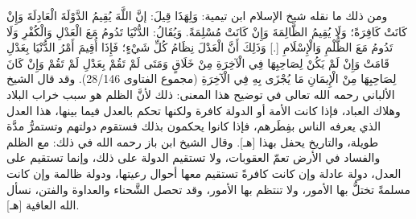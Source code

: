 ومن ذلك ما نقله شيخ الإسلام ابن تيمية: وَلِهَذَا قِيلَ: إنَّ اللَّهَ يُقِيمُ الدَّوْلَةَ الْعَادِلَةَ وَإِنْ كَانَتْ كَافِرَةً؛ وَلَا يُقِيمُ الظَّالِمَةَ وَإِنْ كَانَتْ مُسْلِمَةً. وَيُقَالُ: الدُّنْيَا تَدُومُ مَعَ الْعَدْلِ وَالْكُفْرِ وَلَا تَدُومُ مَعَ الظُّلْمِ وَالْإِسْلَامِ [.] وَذَلِكَ أَنَّ الْعَدْلَ نِظَامُ كُلِّ شَيْءٍ؛ فَإِذَا أُقِيمَ أَمْرُ الدُّنْيَا بِعَدْلِ قَامَتْ وَإِنْ لَمْ يَكُنْ لِصَاحِبِهَا فِي الْآخِرَةِ مِنْ خَلَاقٍ وَمَتَى لَمْ تَقُمْ بِعَدْلِ لَمْ تَقُمْ وَإِنْ كَانَ لِصَاحِبِهَا مِنْ الْإِيمَانِ مَا يُجْزَى بِهِ فِي الْآخِرَةِ {\footnotesize (مجموع الفتاوى 28/146)}. وقد قال الشيخ الألباني رحمه الله تعالى في توضيح هذا المعنى: ذلك لأنَّ الظلم هو سبب خراب البلاد وهلاك العباد، فإذا كانت الأمة أو الدولة كافرة ولكنها تحكم بالعدل فيما بينها، هذا العدل الذي يعرفه الناس بفِطَرهم، فإذا كانوا يحكمون بذلك فستقوم دولتهم وتستمرُّ مدَّة طويلة، والتاريخ يحفل بهذا [هـ]. وقال الشيخ ابن باز رحمه الله في ذلك: مع الظلم والفساد في الأرض تعمّ العقوبات، ولا تستقيم الدولة على ذلك، وإنما تستقيم على العدل، دولة عادلة وإن كانت كافرةً تستقيم معها أحوال رعيتها، ودولة ظالمة وإن كانت مسلمةً تختلُّ بها الأمور، ولا تنتظم بها الأمور، وقد تحصل الشَّحناء والعداوة والفتن، نسأل الله العافية [هـ].


